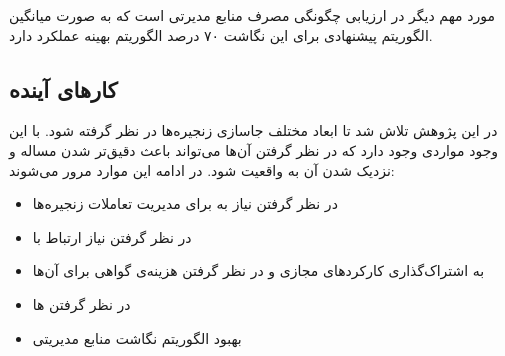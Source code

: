 مورد مهم دیگر در ارزیابی چگونگی مصرف منابع مدیرتی است که به صورت میانگین
الگوریتم پیشنهادی برای این نگاشت ۷۰ درصد الگوریتم بهینه عملکرد دارد.

\subsection{کارهای آینده}

در این پژوهش تلاش شد تا ابعاد مختلف جاسازی زنجیره‌ها در نظر گرفته شود.
با این وجود مواردی وجود دارد که در نظر گرفتن آن‌ها می‌تواند باعث دقیق‌تر شدن مساله
و نزدیک شدن آن به واقعیت شود.
در ادامه این موارد مرور می‌شوند:

\begin{itemize}
    \item در نظر گرفتن نیاز به  برای مدیریت تعاملات زنجیره‌ها
    \item در نظر گرفتن نیاز ارتباط  با 
    \item به اشتراک‌گذاری کارکردهای مجازی و در نظر گرفتن هزینه‌ی گواهی برای آن‌ها
    \item در نظر گرفتن ها
    \item بهبود الگوریتم نگاشت منابع مدیریتی
\end{itemize}